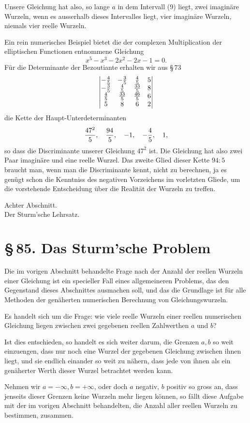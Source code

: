 \documentclass[11pt]{article}
\providecommand{\sect}[2]{\section*{\S\,#1. #2}}
\begin{document}
Unsere Gleichung hat also, so lange $a$ in dem Intervall (9) liegt, zwei imagin\"are Wurzeln, wenn es ausserhalb dieses Intervalles liegt, vier imagin\"are Wurzeln, niemals vier reelle Wurzeln.

Ein rein numerisches Beispiel bietet die der complexen Multiplication der elliptischen Functionen entnommene Gleichung
\[
        x^5-x^3-2x^2-2x-1=0.
\]
F\"ur die Determinante der Bezoutiante erhalten wir aus \S\,73
\[
\begin{vmatrix}
 -\frac45&-\frac35&\frac45&5\cr
 -\frac35&\frac45&\frac{33}{5}&8\cr
 \frac45&\frac{33}{5}&\frac{46}{5}&6\cr
 5&8&6&2
\end{vmatrix}
\]
die Kette der Haupt-Unterdeterminanten
\[
        {47^2\over5},
        \quad {94\over5},
        \quad -1,
        \quad -{4\over5},
        \quad 1,
\]
so dass die Discriminante unserer Gleichung $47^2$ ist. Die Gleichung hat also zwei Paar imagin\"are und eine reelle Wurzel. Das zweite Glied dieser Kette ${94:5}$ braucht man, wenn man die Discriminante kennt, nicht zu berechnen, ja es gen\"ugt schon die Kenntniss des negativen Vorzeichens im vorletzten Gliede, um die vorstehende Entscheidung \"uber die Realit\"at der Wurzeln zu treffen.

\clearpage
\begin{center}
{\large Achter Abschnitt.}\\[0.6em]
{\Large Der Sturm'sche Lehrsatz.}
\end{center}

\sect{85}{Das Sturm'sche Problem}

Die im vorigen Abschnitt behandelte Frage nach der Anzahl der reellen Wurzeln einer Gleichung ist ein specieller Fall eines allgemeineren Problems, das den Gegenstand dieses Abschnittes ausmachen soll, und das die Grundlage ist f\"ur alle Methoden der gen\"aherten numerischen Berechnung von Gleichungswurzeln.

Es handelt sich um die Frage: wie viele reelle Wurzeln einer reellen numerischen Gleichung liegen zwischen zwei gegebenen reellen Zahlwerthen $a$ und $b$?

Ist dies entschieden, so handelt es sich weiter darum, die Grenzen $a,b$ so weit einzuengen, dass nur noch eine Wurzel der gegebenen Gleichung zwischen ihnen liegt, und sie endlich einander so weit zu n\"ahern, dass jede von ihnen als ein gen\"aherter Werth dieser Wurzel betrachtet werden kann.

Nehmen wir $a=-\infty,b=+\infty$, oder doch $a$ negativ, $b$ positiv so gross an, dass jenseits dieser Grenzen keine Wurzeln mehr liegen k\"onnen, so f\"allt diese Aufgabe mit der im vorigen Abschnitt behandelten, die Anzahl aller reellen Wurzeln zu bestimmen, zusammen.
\end{document}
